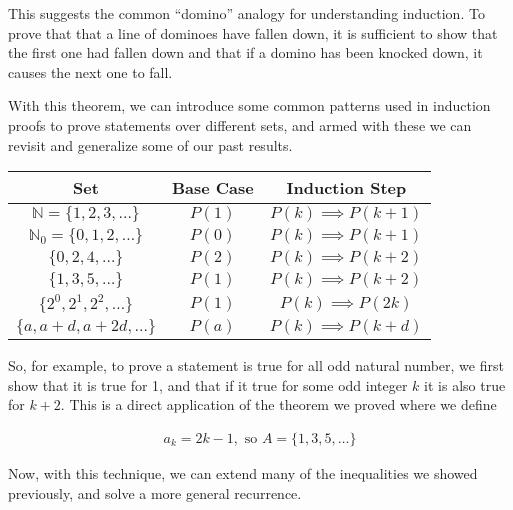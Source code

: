 \documentclass[twoside]{report}
\begin{document}
This suggests the common ``domino'' analogy for understanding induction. To prove that that a line of dominoes have fallen down, it is sufficient to show that the first one had fallen down and that if a domino has been knocked down, it causes the next one to fall.

With this theorem, we can introduce some common patterns used in induction proofs to prove statements over different sets, and armed with these we can revisit and generalize some of our past results.


\vspace{\baselineskip}
\begin{center}
	\begin{tabular}{ccc}
		\toprule
		Set & Base Case & Induction Step \\
		\midrule
		$\mathbb{N} = \{ 1, 2, 3, \dots \}$ & $P(1)$ & $P(k) \implies P(k + 1)$ \\
		$\mathbb{N}_0 = \{ 0, 1, 2, \dots \}$ & $P(0)$ & $P(k) \implies P(k + 1)$ \\
		$\{ 0, 2, 4, \dots \}$ & $P(2)$ & $P(k) \implies P(k + 2)$ \\
		$\{ 1, 3, 5, \dots \}$ & $P(1)$ & $P(k) \implies P(k + 2)$ \\
		$\{ 2^0, 2^1, 2^2, \dots \}$ & $P(1)$ & $P(k) \implies P(2k)$ \\
		$\{ a, a + d, a + 2d, \dots \}$ & $P(a)$ & $P(k) \implies P(k + d)$ \\
		\bottomrule
	\end{tabular}
\end{center}
\vspace{\baselineskip}

So, for example, to prove a statement is true for all odd natural number, we first show that it is true for 1, and that if it true for some odd integer $k$ it is also true for $k + 2$. This is a direct application of the theorem we proved where we define

\begin{align*}
	a_k = 2k - 1, \text{ so } A = \{1, 3, 5, \dots \}
\end{align*}

Now, with this technique, we can extend many of the inequalities we showed previously, and solve a more general recurrence.
\end{document}
